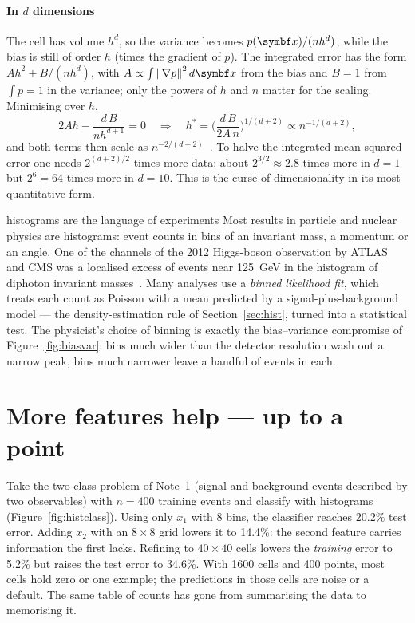 \documentclass[11pt]{article}
\begin{document}
\paragraph{In $d$ dimensions} The cell has volume $h^d$, so the variance becomes $p(\x)/(nh^d)$, while the bias is
still of order $h$ (times the gradient of $p$). The integrated error has the form $A h^2 + B/(nh^d)$, with
$A \propto \int \norm{\nabla p}^2 d\x$ from the bias and $B = 1$ from $\int p = 1$ in the variance; only the powers of
$h$ and $n$ matter for the scaling. Minimising over $h$,
\[
  2Ah - \frac{d\,B}{n h^{d+1}} = 0 \quad\Longrightarrow\quad h^* = \Big(\frac{d\,B}{2A\,n}\Big)^{1/(d+2)} \propto n^{-1/(d+2)},
\]
and both terms then scale as $n^{-2/(d+2)}$~\cite{scott2015}. To halve the integrated mean squared error one needs $2^{(d+2)/2}$ times more
data: about $2^{3/2} \approx 2.8$ times more in $d = 1$ but $2^{6} = 64$ times more in $d = 10$. This is the curse of
dimensionality in its most quantitative form.

\begin{physics}{histograms are the language of experiments}
Most results in particle and nuclear physics are histograms: event counts in bins of an invariant mass, a momentum or
an angle. One of the channels of the 2012 Higgs-boson observation by ATLAS and CMS was a localised excess of events
near 125~GeV in the histogram of diphoton invariant masses~\cite{atlas2012,cms2012}. Many analyses use a
\emph{binned likelihood fit}, which treats each count as Poisson with a mean predicted by a
signal-plus-background model --- the density-estimation rule of Section~\ref{sec:hist}, turned into a statistical test. The
physicist's choice of binning is exactly the bias--variance compromise of Figure~\ref{fig:biasvar}: bins much wider
than the detector resolution wash out a narrow peak, bins much narrower leave a handful of events in each.
\end{physics}

\section{More features help --- up to a point}\label{sec:features}

Take the two-class problem of Note~1 (signal and background events described by two observables) with $n = 400$
training events and classify with histograms (Figure~\ref{fig:histclass}). Using only $x_1$ with 8 bins, the
classifier reaches 20.2\% test error. Adding $x_2$ with an $8 \times 8$ grid lowers it to 14.4\%: the second feature
carries information the first lacks. Refining to $40 \times 40$ cells lowers the \emph{training} error to 5.2\% but
raises the test error to 34.6\%. With 1600 cells and 400 points, most cells hold zero or one example; the
predictions in those cells are noise or a default. The same table of counts has gone from summarising the data to
memorising it.
\end{document}
